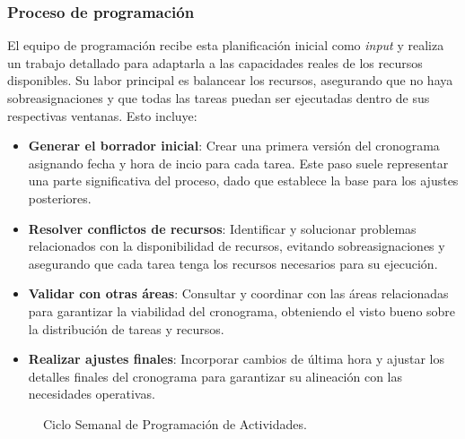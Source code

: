 \documentclass{article}
\begin{document}
\subsubsection{Proceso de programación}

El equipo de programación recibe esta planificación inicial como \textit{input} y realiza un trabajo detallado para adaptarla a las capacidades reales de los recursos disponibles. Su labor principal es balancear los recursos, asegurando que no haya sobreasignaciones y que todas las tareas puedan ser ejecutadas dentro de sus respectivas ventanas. Esto incluye:

\begin{itemize}
    \item \textbf{Generar el borrador inicial}: Crear una primera versión del cronograma asignando fecha y hora de incio para cada tarea. Este paso suele representar una parte significativa del proceso, dado que establece la base para los ajustes posteriores.
    \item \textbf{Resolver conflictos de recursos}: Identificar y solucionar problemas relacionados con la disponibilidad de recursos, evitando sobreasignaciones y asegurando que cada tarea tenga los recursos necesarios para su ejecución.
    \item \textbf{Validar con otras áreas}: Consultar y coordinar con las áreas relacionadas para garantizar la viabilidad del cronograma, obteniendo el visto bueno sobre la distribución de tareas y recursos.
    \item \textbf{Realizar ajustes finales}: Incorporar cambios de última hora y ajustar los detalles finales del cronograma para garantizar su alineación con las necesidades operativas.
\end{itemize}

\begin{figure}[htbp]
    \centering
    \caption{Ciclo Semanal de Programación de Actividades.}
    \label{fig:flowchart}
\end{figure}
\end{document}
